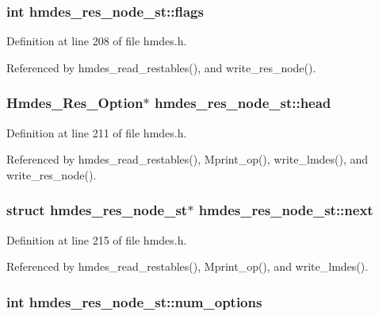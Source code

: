 \subsubsection{\setlength{\rightskip}{0pt plus 5cm}int \bf{hmdes\_\-res\_\-node\_\-st::flags}}\label{structhmdes__res__node__st_08cae646467c766b5938f7825b7bb1ba}




Definition at line 208 of file hmdes.h.

Referenced by hmdes\_\-read\_\-restables(), and write\_\-res\_\-node().
\subsubsection{\setlength{\rightskip}{0pt plus 5cm}\bf{Hmdes\_\-Res\_\-Option}$\ast$ \bf{hmdes\_\-res\_\-node\_\-st::head}}\label{structhmdes__res__node__st_cd490d1bf7dd402b14cbc3b1f5d7282b}




Definition at line 211 of file hmdes.h.

Referenced by hmdes\_\-read\_\-restables(), Mprint\_\-op(), write\_\-lmdes(), and write\_\-res\_\-node().
\subsubsection{\setlength{\rightskip}{0pt plus 5cm}struct \bf{hmdes\_\-res\_\-node\_\-st}$\ast$ \bf{hmdes\_\-res\_\-node\_\-st::next}}\label{structhmdes__res__node__st_b606d85754067aa6ae42cde6ba5c2412}




Definition at line 215 of file hmdes.h.

Referenced by hmdes\_\-read\_\-restables(), Mprint\_\-op(), and write\_\-lmdes().
\subsubsection{\setlength{\rightskip}{0pt plus 5cm}int \bf{hmdes\_\-res\_\-node\_\-st::num\_\-options}}\label{structhmdes__res__node__st_32ee36c2aaa489909591c3385181b0e9}




